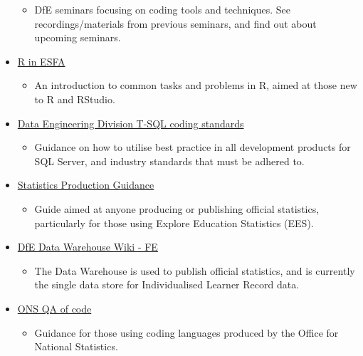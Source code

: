 \documentclass[
]{book}
\providecommand{\tightlist}{%
  \setlength{\itemsep}{0pt}\setlength{\parskip}{0pt}}
\begin{document}
\begin{itemize}
  \begin{itemize}
  \tightlist
  \item
    DfE seminars focusing on coding tools and techniques. See recordings/materials from previous seminars, and find out about upcoming seminars.
  \end{itemize}
\item
  \href{https://rsconnect/rsc/esfa-r-training/}{R in ESFA}

  \begin{itemize}
  \tightlist
  \item
    An introduction to common tasks and problems in R, aimed at those new to R and RStudio.
  \end{itemize}
\item
  \href{https://teams.microsoft.com/l/file/5F396754-1495-49C8-AF19-E00498D2AF2A?tenantId=fad277c9-c60a-4da1-b5f3-b3b8b34a82f9\&fileType=docx\&objectUrl=https\%3A\%2F\%2Feducationgovuk.sharepoint.com\%2Fsites\%2FDAN\%2FShared\%20Documents\%2FAll\%20analysts\%2FTSQL\%20Coding\%20Standards.docx\&baseUrl=https\%3A\%2F\%2Feducationgovuk.sharepoint.com\%2Fsites\%2FDAN\&serviceName=teams\&threadId=19:62586ff36a9046eb9615668635ef3f8b@thread.skype\&groupId=6572094f-43a3-4537-bcf0-fc27dc6557ed}{Data Engineering Division T-SQL coding standards}

  \begin{itemize}
  \tightlist
  \item
    Guidance on how to utilise best practice in all development products for SQL Server, and industry standards that must be adhered to.
  \end{itemize}
\item
  \href{https://rsconnect/rsc/stats-production-guidance/}{Statistics Production Guidance}

  \begin{itemize}
  \tightlist
  \item
    Guide aimed at anyone producing or publishing official statistics, particularly for those using Explore Education Statistics (EES).
  \end{itemize}
\item
  \href{https://educationgovuk.sharepoint.com/sites/lveefa00001/efawiki/Data\%20Warehouse\%20Wiki.aspx}{DfE Data Warehouse Wiki - FE}

  \begin{itemize}
  \tightlist
  \item
    The Data Warehouse is used to publish official statistics, and is currently the single data store for Individualised Learner Record data.
  \end{itemize}
\item
  \href{https://bookdown.org/joshuah40/qa_code/introduction.html}{ONS QA of code}

  \begin{itemize}
  \tightlist
  \item
    Guidance for those using coding languages produced by the Office for National Statistics.
  \end{itemize}
\end{itemize}
\end{document}
